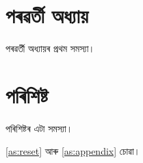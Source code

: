 \documentclass[language=assamese,oneside,openany]{bookbangla}
\begin{document}
\chapter{পৰৱৰ্তী অধ্যায়}
\begin{exercise}\label{as:reset}পৰৱৰ্তী অধ্যায়ৰ প্ৰথম সমস্যা।\end{exercise}
\appendix
\setcounter{chapter}{26}
\chapter{পৰিশিষ্ট}
\begin{exercise}\label{as:appendix}পৰিশিষ্টৰ এটা সমস্যা।\end{exercise}
\autoref{as:reset} আৰু \autoref{as:appendix} চোৱা।
\end{document}
